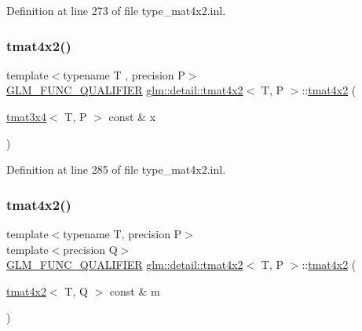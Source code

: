 Definition at line 273 of file type\+\_\+mat4x2.\+inl.

\mbox{\label{structglm_1_1detail_1_1tmat4x2_a810689bea267f9f6fc548ad4e237a2a3}} 
\subsubsection{\texorpdfstring{tmat4x2()}{tmat4x2()}\hspace{0.1cm}{\footnotesize\ttfamily [18/22]}}
{\footnotesize\ttfamily template$<$typename T , precision P$>$ \\
\hyperlink{setup_8hpp_a33fdea6f91c5f834105f7415e2a64407}{G\+L\+M\+\_\+\+F\+U\+N\+C\+\_\+\+Q\+U\+A\+L\+I\+F\+I\+ER} \hyperlink{structglm_1_1detail_1_1tmat4x2}{glm\+::detail\+::tmat4x2}$<$ T, P $>$\+::\hyperlink{structglm_1_1detail_1_1tmat4x2}{tmat4x2} (\begin{DoxyParamCaption}\item[{\hyperlink{structglm_1_1detail_1_1tmat3x4}{tmat3x4}$<$ T, P $>$ const \&}]{x }\end{DoxyParamCaption})\hspace{0.3cm}{\ttfamily [explicit]}}



Definition at line 285 of file type\+\_\+mat4x2.\+inl.

\mbox{\label{structglm_1_1detail_1_1tmat4x2_adbb722f9fddaebd63f497f46b75d004b}} 
\subsubsection{\texorpdfstring{tmat4x2()}{tmat4x2()}\hspace{0.1cm}{\footnotesize\ttfamily [19/22]}}
{\footnotesize\ttfamily template$<$typename T, precision P$>$ \\
template$<$precision Q$>$ \\
\hyperlink{setup_8hpp_a33fdea6f91c5f834105f7415e2a64407}{G\+L\+M\+\_\+\+F\+U\+N\+C\+\_\+\+Q\+U\+A\+L\+I\+F\+I\+ER} \hyperlink{structglm_1_1detail_1_1tmat4x2}{glm\+::detail\+::tmat4x2}$<$ T, P $>$\+::\hyperlink{structglm_1_1detail_1_1tmat4x2}{tmat4x2} (\begin{DoxyParamCaption}\item[{\hyperlink{structglm_1_1detail_1_1tmat4x2}{tmat4x2}$<$ T, Q $>$ const \&}]{m }\end{DoxyParamCaption})}



